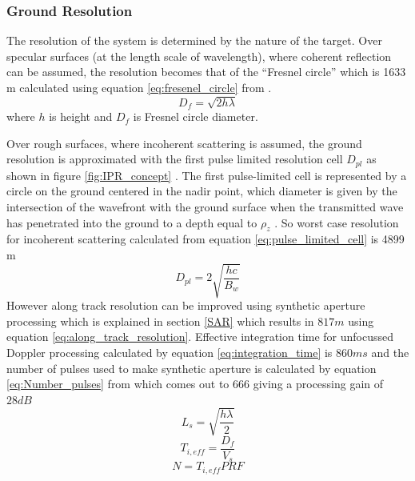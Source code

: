 \subsubsection{Ground Resolution}


The resolution of the system is determined by the nature of the target. Over specular surfaces (at the length scale of wavelength), where coherent reflection can be assumed, the resolution becomes that of the ``Fresnel circle'' which is 1633 m calculated using equation \ref{eq:fresenel_circle} from \cite{SHARAD}.
\begin{equation}
D_{f} = \sqrt{2h\lambda}
\label{eq:fresenel_circle}
\end{equation}
where $h$ is height and $D_{f}$ is Fresnel circle diameter.

Over rough surfaces, where incoherent scattering is assumed, the ground resolution is approximated with the first pulse limited resolution cell $D_{pl}$ as shown in figure \ref{fig:IPR_concept} . The first pulse-limited cell is represented by a circle on the ground centered in the nadir point, which diameter is given by the intersection of the wavefront with the ground surface when the transmitted wave has penetrated into the ground to a depth equal to $\rho_{z}$ \cite{Gany_SRS}. So worst case resolution for incoherent scattering calculated from equation \ref{eq:pulse_limited_cell} is 4899 m 
\begin{equation}
D_{pl} = 2\sqrt{\dfrac{hc}{B_{w}}}
\label{eq:pulse_limited_cell}
\end{equation}
However along track resolution can be improved using synthetic aperture processing which is explained in section \ref{SAR} which results in $817 m$ using equation \ref{eq:along_track_resolution}. Effective integration time for unfocussed Doppler processing calculated by equation \ref{eq:integration_time} is $860 ms$ and the number of pulses used to make synthetic aperture is calculated by equation \ref{eq:Number_pulses} from \cite{Gany_SRS}  which comes out to 666 giving a processing gain of $28 dB$ 
%
\begin{equation}
L_{s} = \sqrt{\dfrac{h\lambda}{2}}
\label{eq:along_track_resolution}
\end{equation}
%
\begin{equation}
T_{i,eff} = \dfrac{D_{f}}{V_{s}}
\label{eq:integration_time}
\end{equation}
\begin{equation}
N = T_{i,eff}PRF 
\label{eq:Number_pulses}
\end{equation}
%
